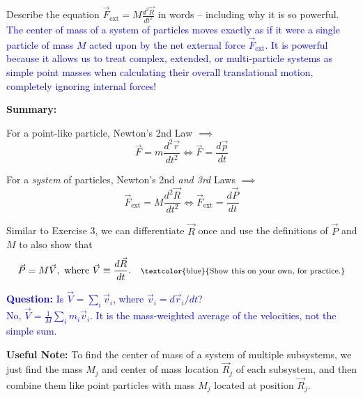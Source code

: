 \documentclass[11pt, letterpaper, openany]{book}
\newenvironment{exercise}[1][Exercise]{%
  \tcolorbox[blanker, breakable, left=1em,
    before skip=1em, after skip=1em,
    borderline west={3pt}{0pt}{PhysNavy},
    colback=PhysCream,
    before upper={\textcolor{PhysNavy}{\sffamily\bfseries #1:}\space}
  ]%
}{%
  \endtcolorbox%
}
\begin{document}
\begin{exercise}[Exercise 4]
Describe the equation $\vec{F}_{\text{ext}} = M\frac{d^2\vec{R}}{dt^2}$ in words -- including why it is so powerful. \\
\textcolor{blue}{The center of mass of a system of particles moves exactly as if it were a single particle of mass $M$ acted upon by the net external force $\vec{F}_{\text{ext}}$. It is powerful because it allows us to treat complex, extended, or multi-particle systems as simple point masses when calculating their overall translational motion, completely ignoring internal forces!}
\end{exercise}

\textbf{Summary:}

For a point-like particle, Newton's 2nd Law $\implies$
\[ \vec{F} = m\frac{d^2\vec{r}}{dt^2} \iff \vec{F} = \frac{d\vec{p}}{dt} \tag{4} \]

For a \textit{system} of particles, Newton's 2nd \textit{and 3rd} Laws $\implies$
\[ \vec{F}_{\text{ext}} = M\frac{d^2\vec{R}}{dt^2} \iff \vec{F}_{\text{ext}} = \frac{d\vec{P}}{dt} \tag{5} \]

Similar to Exercise 3, we can differentiate $\vec{R}$ once and use the definitions of $\vec{P}$ and $M$ to also show that
\[ \vec{P} = M\vec{V}, \text{ where } \vec{V} \equiv \frac{d\vec{R}}{dt}. \quad \text{\footnotesize{\textcolor{blue}{Show this on your own, for practice.}}} \]

\textcolor{blue}{\textbf{Question:} Is $\vec{V} = \sum_i \vec{v}_i$, where $\vec{v}_i = d\vec{r}_i/dt$?} \\
\textcolor{blue}{No, $\vec{V} = \frac{1}{M}\sum_i m_i\vec{v}_i$. It is the mass-weighted average of the velocities, not the simple sum.}

\textbf{Useful Note:} To find the center of mass of a system of multiple subsystems, we just find the mass $M_j$ and center of mass location $\vec{R}_j$ of each subsystem, and then combine them like point particles with mass $M_j$ located at position $\vec{R}_j$.

\begin{center}
\end{center}
\end{document}
